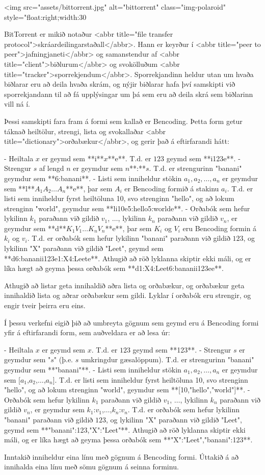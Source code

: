 
<img src="assets/bittorrent.jpg" alt="bittorrent" class="img-polaroid" style="float:right;width:30%

BitTorrent er mikið notaður <abbr title="file transfer
protocol">skráardeilingarstaðall</abbr>. Hann er keyrður í <abbr title="peer to
peer">jafningjaneti</abbr> og samanstendur af <abbr
title="client">biðlurum</abbr> og svokölluðum <abbr
title="tracker">sporrekjendum</abbr>. Sporrekjandinn heldur utan um hvaða
biðlarar eru að deila hvaða skrám, og nýjir biðlarar hafa því samskipti við
sporrekjandann til að fá upplýsingar um þá sem eru að deila skrá sem biðlarinn
vill ná í.

Þessi samskipti fara fram á formi sem kallað er Bencoding. Þetta form getur
táknað heiltölur, strengi, lista og svokallaðar <abbr
title="dictionary">orðabækur</abbr>, og gerir það á eftirfarandi hátt:

- Heiltala $x$ er geymd sem **i**$x$**e**. T.d. er $123$ geymd sem **i123e**.
- Strengur $s$ af lengd $n$ er geymdur sem $n$**:**$s$. T.d. er strengurinn
  "banani" geymdur sem **6:banani**.
- Listi sem inniheldur stökin $a_1, a_2, \ldots, a_n$ er geymdur sem
  **l**$A_1$$A_2$$\ldots$$A_n$**e**, þar sem $A_i$ er Bencoding formið á
  stakinu $a_i$. T.d. er listi sem inniheldur fyrst heiltöluna 10, svo
  strenginn "hello", og að lokum strenginn "world", geymdur sem
  **li10e5:hello5:worlde**.
- Orðabók sem hefur lykilinn $k_1$ paraðann við gildið $v_1$, $\ldots$,
  lykilinn $k_n$ paraðann við gildið $v_n$, er geymdur sem
  **d**$K_1$$V_1$$\ldots$$K_n$$V_n$**e**, þar sem $K_i$ og $V_i$ eru Bencoding
  formin á $k_i$ og $v_i$. T.d. er orðabók sem hefur lykilinn "banani" paraðann
  við gildið $123$, og lykilinn "X" paraðann við gildið "Leet", geymd sem
  **d6:bananii123e1:X4:Leete**. Athugið að röð lyklanna skiptir ekki máli, og
  er líka hægt að geyma þessa orðabók sem **d1:X4:Leet6:bananii123ee**.

Athugið að listar geta innihaldið aðra lista og orðabækur, og orðabækur geta
innihaldið lista og aðrar orðabækur sem gildi. Lyklar í orðabók eru strengir,
og engir tveir þeirra eru eins.

Í þessu verkefni eigið þið að umbreyta gögnum sem geymd eru á Bencoding formi
yfir á eftirfarandi form, sem auðveldara er að lesa úr:

- Heiltala $x$ er geymd sem $x$. T.d. er $123$ geymd sem **123**.
- Strengur $s$ er geymdur sem "$s$" (þ.e. $s$ umkringdur gæsalöppum). T.d. er
  strengurinn "banani" geymdur sem **"banani"**.
- Listi sem inniheldur stökin $a_1, a_2, \ldots, a_n$ er geymdur sem
  [$a_1$,$a_2$,$\ldots$,$a_n$]. T.d. er listi sem inniheldur fyrst heiltöluna
  10, svo strenginn "hello", og að lokum strenginn "world", geymdur sem
  **[10,"hello","world"]**.
- Orðabók sem hefur lykilinn $k_1$ paraðann við gildið $v_1$, $\ldots$,
  lykilinn $k_n$ paraðann við gildið $v_n$, er geymdur sem
  {$k_1$:$v_1$,$\ldots$,$k_n$:$v_n$}. T.d. er orðabók sem hefur lykilinn
  "banani" paraðann við gildið $123$, og lykilinn "X" paraðann við gildið
  "Leet", geymd sem **{"banani":123,"X":"Leet"}**. Athugið að röð lyklanna
  skiptir ekki máli, og er líka hægt að geyma þessa orðabók sem
  **{"X":"Leet","banani":123}**.

Inntakið inniheldur eina línu með gögnum á Bencoding formi. Úttakið á að
innihalda eina línu með sömu gögnum á seinna forminu.


